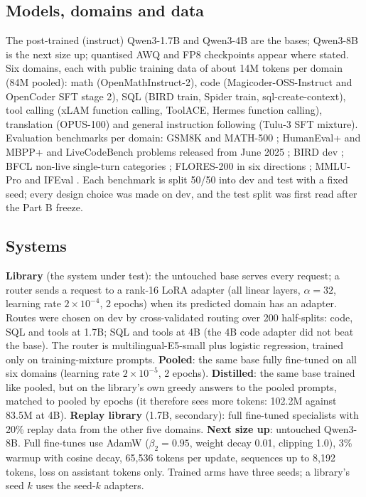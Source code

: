 \documentclass[11pt]{article}
\begin{document}
\subsection{Models, domains and data}
The post-trained (instruct) Qwen3-1.7B and Qwen3-4B are the bases; Qwen3-8B is the next size up; quantised
AWQ and FP8 checkpoints appear where stated. Six domains, each with public training data of about 14M tokens per
domain (84M pooled): math (OpenMathInstruct-2), code (Magicoder-OSS-Instruct and OpenCoder SFT stage 2), SQL (BIRD
train, Spider train, sql-create-context), tool calling (xLAM function calling, ToolACE, Hermes function calling),
translation (OPUS-100) and general instruction following (Tulu-3 SFT mixture). Evaluation benchmarks per domain:
GSM8K \citep{cobbe2021gsm8k} and MATH-500 \citep{lightman2023verify}; HumanEval+ and MBPP+ \citep{liu2023evalplus}
and LiveCodeBench problems released from June 2025 \citep{jain2024livecodebench}; BIRD dev \citep{li2023bird}; BFCL
non-live single-turn categories \citep{patil2023gorilla}; FLORES-200 in six directions \citep{nllb2022}; MMLU-Pro
\citep{wang2024mmlupro} and IFEval \citep{zhou2023ifeval}. Each benchmark is split 50/50 into dev and test with a
fixed seed; every design choice was made on dev, and the test split was first read after the Part B freeze.

\subsection{Systems}
\textbf{Library} (the system under test): the untouched base serves every request; a router sends a request to a
rank-16 LoRA adapter \citep{hu2021lora} (all linear layers, $\alpha=32$, learning rate $2\times10^{-4}$, 2 epochs)
when its predicted domain has an adapter. Routes were chosen on dev by cross-validated routing over 200 half-splits:
code, SQL and tools at 1.7B; SQL and tools at 4B (the 4B code adapter did not beat the base). The router is
multilingual-E5-small plus logistic regression, trained only on training-mixture prompts. \textbf{Pooled}: the same
base fully fine-tuned on all six domains (learning rate $2\times10^{-5}$, 2 epochs). \textbf{Distilled}: the same
base trained like pooled, but on the library's own greedy answers to the pooled prompts, matched to pooled by
epochs (it therefore sees more tokens: 102.2M against 83.5M at 4B). \textbf{Replay library} (1.7B, secondary):
full fine-tuned specialists with 20\% replay data from the other five domains. \textbf{Next size up}: untouched
Qwen3-8B. Full fine-tunes use AdamW ($\beta_2=0.95$, weight decay 0.01, clipping 1.0), 3\% warmup with cosine
decay, 65,536 tokens per update, sequences up to 8,192 tokens, loss on assistant tokens only. Trained arms have three
seeds; a library's seed $k$ uses the seed-$k$ adapters.
\end{document}
